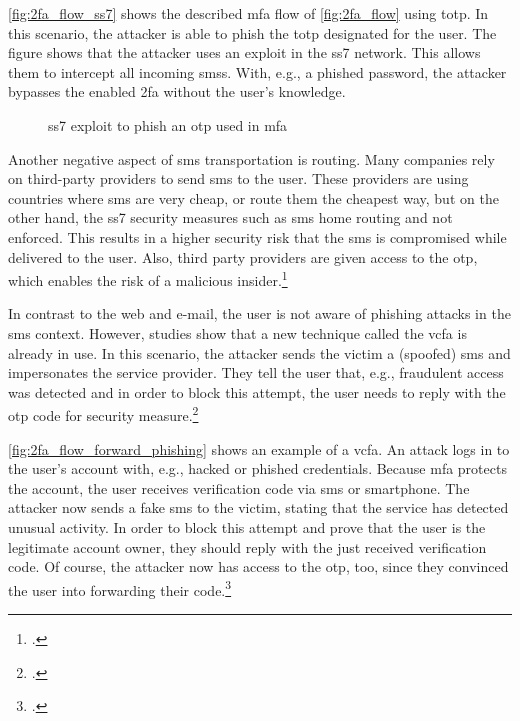 \autoref{fig:2fa_flow_ss7} shows the described \gls{mfa} flow of \autoref{fig:2fa_flow} using \gls{totp}. In this scenario, the attacker is able to phish the \gls{totp} designated for the user. The figure shows that the attacker uses an exploit in the \gls{ss7} network. This allows them to intercept all incoming \glspl{sms}. With, e.g., a phished password, the attacker bypasses the enabled \gls{2fa} without the user's knowledge.

\begin{figure}[hbt]
	\centering
	
	\caption[\gls{ss7} exploit to phish an \gls{otp} used in \gls{mfa}]{\gls{ss7} exploit to phish an \gls{otp} used in \gls{mfa}\footnotemark}
	\label{fig:2fa_flow_ss7}
\end{figure}

Another negative aspect of \gls{sms} transportation is routing. Many companies rely on third-party providers to send \gls{sms} to the user. These providers are using countries where \gls{sms} are very cheap, or route them the cheapest way, but on the other hand, the \gls{ss7} security measures such as \gls{sms} home routing and not enforced. This results in a higher security risk that the \gls{sms} is compromised while delivered to the user. Also, third party providers are given access to the \gls{otp}, which enables the risk of a malicious insider.\footcites[See][153]{10.1007/978-3-642-39235-1_9}[See][4, 9, 12]{Certic2018}

In contrast to the web and e-mail, the user is not aware of phishing attacks in the \gls{sms} context. However, studies show that a new technique called the \gls{vcfa} is already in use. In this scenario, the attacker sends the victim a (spoofed) \gls{sms} and impersonates the service provider. They tell the user that, e.g., fraudulent access was detected and in order to block this attempt, the user needs to reply with the \gls{otp} code for security measure.\footcites[See][6--7]{JAKOBSSON20186}[See][4--5]{SIADATI201714}

\newpage

\autoref{fig:2fa_flow_forward_phishing} shows an example of a \gls{vcfa}. An attack logs in to the user's account with, e.g., hacked or phished credentials. Because \gls{mfa} protects the account, the user receives verification code via \gls{sms} or smartphone. The attacker now sends a fake \gls{sms} to the victim, stating that the service has detected unusual activity. In order to block this attempt and prove that the user is the legitimate account owner, they should reply with the just received verification code. Of course, the attacker now has access to the \gls{otp}, too, since they convinced the user into forwarding their code.\footcites[See][66]{10.1007/978-3-319-29938-9_5}

